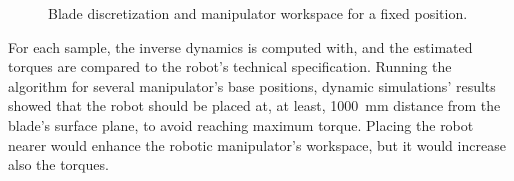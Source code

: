 \begin{figure}
	\centering
	\quad
	\caption{Blade discretization and manipulator workspace for a fixed position.}
\end{figure}

For each sample, the inverse dynamics is computed with, and the estimated
torques are compared to the robot's technical specification. Running
the algorithm for several manipulator's base positions, dynamic simulations'
results showed that the robot should be placed at, at least, 1000~mm distance
from the blade's surface plane, to avoid reaching maximum torque.
Placing the robot nearer would enhance the robotic manipulator's workspace, but
it would increase also the torques.

